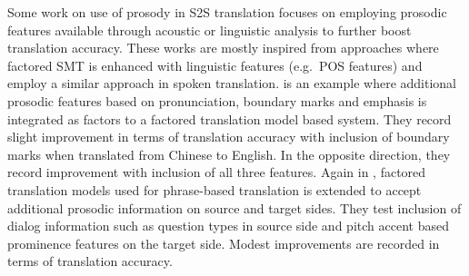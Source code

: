 Some work on use of prosody in S2S translation focuses on employing prosodic features available through acoustic or linguistic analysis to further boost translation accuracy. These works are mostly inspired from approaches where factored SMT is enhanced with linguistic features (e.g.~POS features) and employ a similar approach in spoken translation. \cite{Guo2016} is an example where additional prosodic features based on pronunciation, boundary marks and emphasis is integrated as factors to a factored translation model based system. They record slight improvement in terms of translation accuracy with inclusion of boundary marks when translated from Chinese to English. In the opposite direction, they record improvement with inclusion of all three features. Again in \cite{RangarajanSridhar:2013:enrichingS2S}, factored translation models used for phrase-based translation is extended to accept additional prosodic information on source and target sides. They test inclusion of dialog information such as question types in source side and pitch accent based prominence features on the target side. Modest improvements are recorded in terms of translation accuracy. 